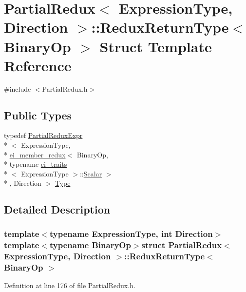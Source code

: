 \hypertarget{struct_partial_redux_1_1_redux_return_type}{\section{Partial\-Redux$<$ Expression\-Type, Direction $>$\-:\-:Redux\-Return\-Type$<$ Binary\-Op $>$ Struct Template Reference}
\label{struct_partial_redux_1_1_redux_return_type}
}


{\ttfamily \#include $<$Partial\-Redux.\-h$>$}

\subsection*{Public Types}
\begin{DoxyCompactItemize}
\item 
typedef \hyperlink{class_partial_redux_expr}{Partial\-Redux\-Expr}\\*
$<$ Expression\-Type, \\*
\hyperlink{structei__member__redux}{ei\-\_\-member\-\_\-redux}$<$ Binary\-Op, \\*
typename \hyperlink{structei__traits}{ei\-\_\-traits}\\*
$<$ Expression\-Type $>$\-::\hyperlink{class_partial_redux_a5884ea45b5cd9ba86feef9193cf56fa8}{Scalar} $>$\\*
, Direction $>$ \hyperlink{struct_partial_redux_1_1_redux_return_type_ab9976d442c8a54655b6c16ecc8ad8aa5}{Type}
\end{DoxyCompactItemize}


\subsection{Detailed Description}
\subsubsection*{template$<$typename Expression\-Type, int Direction$>$template$<$typename Binary\-Op$>$struct Partial\-Redux$<$ Expression\-Type, Direction $>$\-::\-Redux\-Return\-Type$<$ Binary\-Op $>$}



Definition at line 176 of file Partial\-Redux.\-h.



